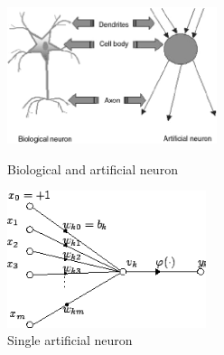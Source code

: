 \begin{figure}[H]
	\centering
	\includegraphics[height=4cm]{images/Fig-1-Analogy-between-artificial-neuron-and-biological-neuron.png}
	\caption{Biological and artificial neuron \cite{analogyneurons}}
	\label{fig:artifical_and_biological}
	\endminipage\hfill
	\includegraphics[height=4cm]{images/artificial_neuron.png}
	\caption{Single artificial neuron \cite{artificialneuron}}
	\label{fig:artificial_neuron}
	\endminipage
\end{figure}

